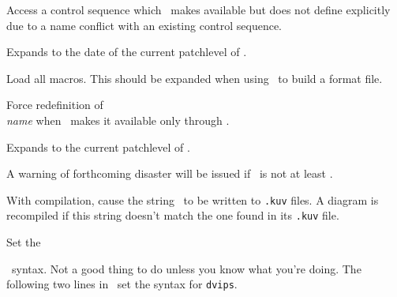 Access a control sequence which \kuvio\ makes available but does not define
explicitly due to a name conflict with an existing control sequence.
\endentry

Expands to the date of the current patchlevel of \kuvio.
\endentry

\comment
\endentry

\endentry
\endcomment

Load all macros. This should be expanded when using \kuvio\ to build a
format file.
\endentry

Force redefinition of \ch\\\emph{name} when \kuvio\ makes it available only
through \csq\kuviocs.
\endentry

\comment
\endentry
\endcomment

Expands to the current patchlevel of \kuvio.
\endentry

A warning of forthcoming disaster will be issued if \csq\kuviopatchlevel\ is
not at least \int.
\endentry

With compilation, cause the string \text\ to be written to {\tt .kuv} files.
A diagram is recompiled if this string doesn't match the one found in its
{\tt .kuv} file.
\endentry

Set the \csq\special\ syntax. Not a good thing to do unless you know what
you're doing. The following two lines in \kuvio\ set the syntax for
{\tt dvips}.

\code
\def\dvipsspecial#1{\special{ps:#1}}
\kuviospecial\dvipsspecial
\endcode

